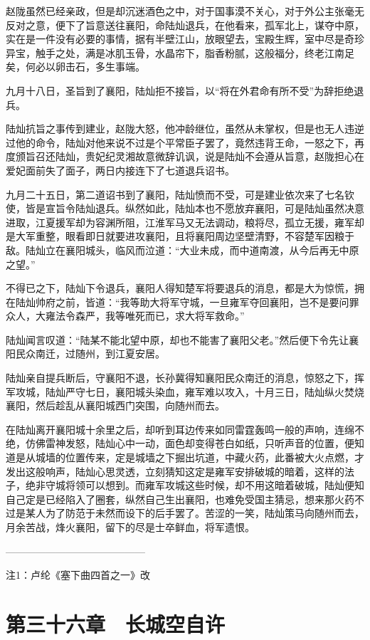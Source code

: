 赵陇虽然已经亲政，但是却沉迷酒色之中，对于国事漠不关心，对于外公主张毫无反对之意，便下了旨意送往襄阳，命陆灿退兵，在他看来，孤军北上，谋夺中原，实在是一件没有必要的事情，据有半壁江山，放眼望去，宝殿生辉，室中尽是奇珍异宝，触手之处，满是冰肌玉骨，水晶帘下，脂香粉腻，这般福分，终老江南足矣，何必以卵击石，多生事端。

九月十八日，圣旨到了襄阳，陆灿拒不接旨，以“将在外君命有所不受”为辞拒绝退兵。

陆灿抗旨之事传到建业，赵陇大怒，他冲龄继位，虽然从未掌权，但是也无人违逆过他的命令，陆灿对他来说不过是个平常臣子罢了，竟然违背王命，一怒之下，再度颁旨召还陆灿，贵妃纪灵湘故意微辞讥讽，说是陆灿不会遵从旨意，赵陇担心在爱妃面前失了面子，两日内接连下了七道退兵诏书。

九月二十五日，第二道诏书到了襄阳，陆灿愤而不受，可是建业依次来了七名钦使，皆是宣旨令陆灿退兵。纵然如此，陆灿本也不愿放弃襄阳，可是陆灿虽然决意进取，江夏援军却为容渊所阻，江淮军马又无法调动，粮将尽，孤立无援，雍军却是大军重整，眼看即日就要进攻襄阳，且将襄阳周边坚壁清野，不容楚军因粮于敌。陆灿立在襄阳城头，临风而泣道：“大业未成，而中道南渡，从今后再无中原之望。”

不得已之下，陆灿下令退兵，襄阳人得知楚军将要退兵的消息，都是大为惊慌，拥在陆灿帅府之前，皆道：“我等助大将军守城，一旦雍军夺回襄阳，岂不是要问罪众人，大雍法令森严，我等唯死而已，求大将军救命。”

陆灿闻言叹道：“陆某不能北望中原，却也不能害了襄阳父老。”然后便下令先让襄阳民众南迁，过随州，到江夏安居。

陆灿亲自提兵断后，守襄阳不退，长孙冀得知襄阳民众南迁的消息，惊怒之下，挥军攻城，陆灿严守七日，襄阳城头染血，雍军难以攻入，十月三日，陆灿纵火焚烧襄阳，然后趁乱从襄阳城西门突围，向随州而去。

在陆灿离开襄阳城十余里之后，却听到耳边传来如同雷霆轰鸣一般的声响，连绵不绝，仿佛雷神发怒，陆灿心中一动，面色却变得苍白如纸，只听声音的位置，便知道是从城墙的位置传来，定是城墙之下掘出坑道，中藏火药，此番被大火点燃，才发出这般响声，陆灿心思灵透，立刻猜知这定是雍军安排破城的暗着，这样的法子，绝非守城将领可以想到。而雍军攻城这些时候，却不用这暗着破城，陆灿便知自己定是已经陷入了圈套，纵然自己生出襄阳，也难免受国主猜忌，想来那火药不过是某人为了防范于未然而设下的后手罢了。苦涩的一笑，陆灿策马向随州而去，月余苦战，烽火襄阳，留下的尽是士卒鲜血，将军遗恨。

——————————————

注1：卢纶《塞下曲四首之一》改

\chapter{第三十六章　长城空自许}

